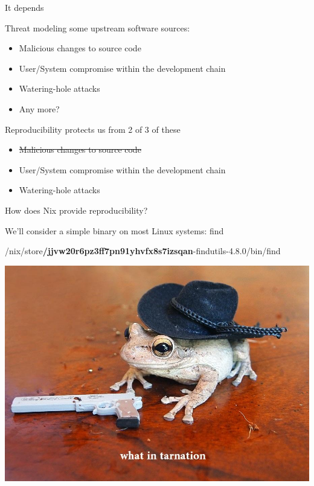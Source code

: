 \documentclass{beamer}
\begin{document}
\begin{frame}
    \centering It depends
\end{frame}

\begin{frame}
    Threat modeling some upstream software sources:
    \begin{itemize}
        \item Malicious changes to source code
        \item User/System compromise within the development chain
        \item Watering-hole attacks
        \item Any more?
    \end{itemize}
\end{frame}

\begin{frame}
    Reproducibility protects us from 2 of 3 of these
    \begin{itemize}
        \item \st{Malicious changes to source code}
        \item User/System compromise within the development chain
        \item Watering-hole attacks
    \end{itemize}
\end{frame}

\begin{frame}
    \centering
    How does Nix provide reproducibility?
\end{frame}

\begin{frame}
    \centering
    We'll consider a simple binary on most Linux systems: find
\end{frame}

\begin{frame}
    \centering
    /nix/store\textbf{/jjvw20r6pz3ff7pn91yhvfx8s7izsqan}-findutils-4.8.0/bin/find
\end{frame}

\begin{frame}
    \includegraphics[width=\textwidth,keepaspectratio]{../resources/what-in.jpg}
\end{frame}
\end{document}
